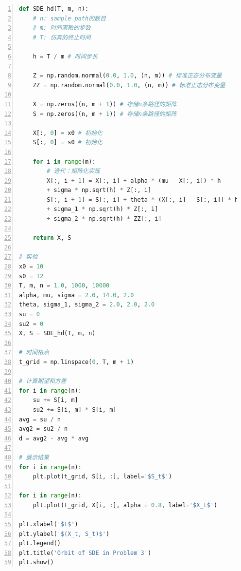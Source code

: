 \documentclass{article}
\begin{document}
\begin{lstlisting}[language = python, numbers=left, numberstyle=\tiny, keywordstyle=\color{blue!70}, commentstyle=\color{red!50!green!50!blue!50},frame=shadowbox,rulesepcolor=\color{red!20!green!20!blue!20},basicstyle=\ttfamily]
def SDE_hd(T, m, n): 
    # n: sample path的数目
    # m: 时间离散的步数
    # T: 仿真的终止时间
    
    h = T / m # 时间步长
    
    Z = np.random.normal(0.0, 1.0, (n, m)) # 标准正态分布变量
    ZZ = np.random.normal(0.0, 1.0, (n, m)) # 标准正态分布变量
    
    X = np.zeros((n, m + 1)) # 存储n条路径的矩阵
    S = np.zeros((n, m + 1)) # 存储n条路径的矩阵
    
    X[:, 0] = x0 # 初始化
    S[:, 0] = s0 # 初始化
    
    for i in range(m):
        # 迭代：矩阵化实现
        X[:, i + 1] = X[:, i] + alpha * (mu - X[:, i]) * h 
        + sigma * np.sqrt(h) * Z[:, i]
        S[:, i + 1] = S[:, i] + theta * (X[:, i] - S[:, i]) * h 
        + sigma_1 * np.sqrt(h) * Z[:, i] 
        + sigma_2 * np.sqrt(h) * ZZ[:, i]
    
    return X, S

# 实验
x0 = 10
s0 = 12
T, m, n = 1.0, 1000, 10000
alpha, mu, sigma = 2.0, 14.0, 2.0
theta, sigma_1, sigma_2 = 2.0, 2.0, 2.0
su = 0
su2 = 0
X, S = SDE_hd(T, m, n)

# 时间格点
t_grid = np.linspace(0, T, m + 1)

# 计算期望和方差
for i in range(n):
    su += S[i, m]
    su2 += S[i, m] * S[i, m]
avg = su / n
avg2 = su2 / n
d = avg2 - avg * avg

# 展示结果
for i in range(n):    
    plt.plot(t_grid, S[i, :], label='$S_t$')
    
for i in range(n):
    plt.plot(t_grid, X[i, :], alpha = 0.8, label='$X_t$')

plt.xlabel('$t$')
plt.ylabel('$(X_t, S_t)$')
plt.legend()
plt.title('Orbit of SDE in Problem 3')
plt.show()
\end{lstlisting}












\end{document}

